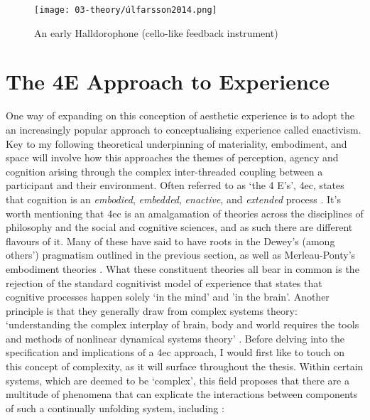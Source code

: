 \begin{figure}[h]
    \centering
    \texttt{[image: 03-theory/úlfarsson2014.png]}
    \captionsetup{justification=centering,margin=1.5cm}
    \caption{An early Halldorophone (cello-like feedback instrument) \citep[from][]{ulfarsson2014}}\label{fig: ulfarsson2014}
\end{figure}

\section{The 4E Approach to Experience}\label{sec: theory-4e}
One way of expanding on this conception of aesthetic experience is to adopt the an increasingly popular approach to conceptualising experience called enactivism. Key to my following theoretical underpinning of materiality, embodiment, and space will involve how this approaches the themes of perception, agency and cognition arising through the complex inter-threaded coupling between a participant and their environment. Often referred to as `the 4 E's', \gls{4ec}, states that cognition is an \textit{embodied}, \textit{embedded}, \textit{enactive}, and \textit{extended} process \citep{gallagher2017}. It's worth mentioning that \gls{4ec} is an amalgamation of theories across the disciplines of philosophy and the social and cognitive sciences, and as such there are different flavours of it. Many of these have said to have roots in the Dewey's (among others') pragmatism outlined in the previous section, as well as Merleau-Ponty's embodiment theories \citep{zavota2016}. What these constituent theories all bear in common is the rejection of the standard cognitivist model of experience that states that cognitive processes happen solely `in the mind' and 'in the brain'. Another principle is that they generally draw from complex systems theory: `understanding the complex interplay of brain, body and world requires the tools and methods of nonlinear dynamical systems theory' \citep{clark1999}. Before delving into the specification and implications of a \gls{4ec} approach, I would first like to touch on this concept of complexity, as it will surface throughout the thesis. Within certain systems, which are deemed to be `complex', this field proposes that there are a multitude of phenomena that can explicate the interactions between components of such a continually unfolding system, including \citep{dedomenico2019}:

